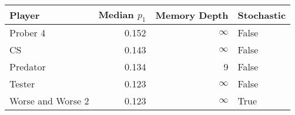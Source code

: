 \begin{tabular}{lrrl}
\toprule
            Player &  Median $p_1$ &  Memory Depth & Stochastic \\
\midrule
          Prober 4 &         0.152 &            \(\infty\) &      False \\
                CS &         0.143 &            \(\infty\) &      False \\
          Predator &         0.134 &             9 &      False \\
            Tester &         0.123 &            \(\infty\) &      False \\
 Worse and Worse 2 &         0.123 &            \(\infty\) &       True \\
\bottomrule
\end{tabular}
